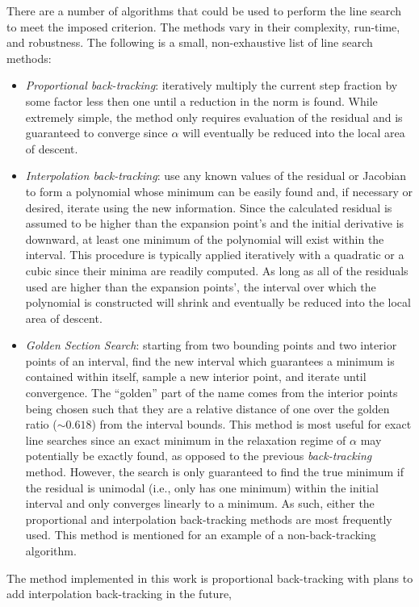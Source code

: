 \documentclass[12pt]{UWMadThesis}
\begin{document}
There are a number of algorithms that could be used to perform the line search to meet the imposed criterion.
The methods vary in their complexity, run-time, and robustness.
The following is a small, non-exhaustive list of line search methods:
\begin{itemize}
	\item{\textit{Proportional back-tracking}: 
        iteratively multiply the current step fraction by some factor less then one until a reduction in the norm is found.
        While extremely simple, the method only requires evaluation of the residual and is guaranteed to converge since $\alpha$ will eventually be reduced into the local area of descent.
    }
    \item{\textit{Interpolation back-tracking}:
        use any known values of the residual or Jacobian to form a polynomial whose minimum can be easily found and, if necessary or desired, iterate using the new information.
        Since the calculated residual is assumed to be higher than the expansion point's and the initial derivative is downward, at least one minimum of the polynomial will exist within the interval.
        This procedure is typically applied iteratively with a quadratic or a cubic since their minima are readily computed.
        As long as all of the residuals used are higher than the expansion points', the interval over which the polynomial is constructed will shrink and eventually be reduced into the local area of descent.
    }
    \item{\textit{Golden Section Search}:
        starting from two bounding points and two interior points of an interval, find the new interval which guarantees a minimum is contained within itself, sample a new interior point, and iterate until convergence.
        The ``golden'' part of the name comes from the interior points being chosen such that they are a relative distance of one over the golden ratio ($\sim0.618$) from the interval bounds.
        This method is most useful for exact line searches since an exact minimum in the relaxation regime of $\alpha$ may potentially be exactly found, as opposed to the previous \textit{back-tracking} method.
        However, the search is only guaranteed to find the true minimum if the residual is unimodal (i.e., only has one minimum) within the initial interval and only converges linearly to a minimum.
        As such, either the proportional and interpolation back-tracking methods are most frequently used.
        This method is mentioned for an example of a non-back-tracking algorithm.
    }
\end{itemize}
The method implemented in this work is proportional back-tracking with plans to add interpolation back-tracking in the future,
\end{document}
